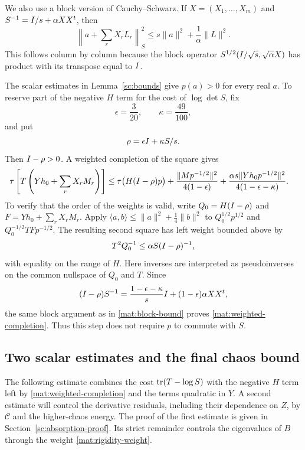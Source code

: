 We also use a block version of Cauchy--Schwarz.  If
$X=(X_1,\ldots,X_m)$ and $S^{-1}=I/s+\alpha XX^t$, then
\begin{equation}\label{mat:block-bound}
 \left\|a+\sum_rX_rL_r\right\|_S^2
 \le s\|a\|^2+\frac1\alpha\|L\|^2.
\end{equation}
This follows column by column because the block operator
$S^{1/2}(I/\sqrt{s},\sqrt{\alpha}X)$ has product with its transpose
equal to $I$.

The scalar estimates in Lemma~\ref{sc:bounds} give $p(a)>0$ for every
real $a$.  To reserve part of the negative $H$ term for the cost of
$\log\det S$, fix
\begin{equation}\label{mat:completion-constants}
 \epsilon=\frac3{20},\qquad\kappa=\frac{49}{100},
\end{equation}
and put
\[
 \rho=\epsilon I+\kappa S/s.
\]
Then $I-\rho>0$.  A weighted completion of the square gives
\begin{align}
 \tau\left[T\left(Yh_0+\sum_rX_rM_r\right)\right]
 &\le\tau\bigl(H(I-\rho)p\bigr)
       +\frac{\|M p^{-1/2}\|^2}{4(1-\epsilon)}
       +\frac{\alpha s\|Yh_0p^{-1/2}\|^2}
                    {4(1-\epsilon-\kappa)}.
 \label{mat:weighted-completion}
\end{align}
To verify that the order of the weights is valid, write
$Q_0=H(I-\rho)$ and $F=Yh_0+\sum_rX_rM_r$.
Apply $\langle a,b\rangle\le\|a\|^2+\frac14\|b\|^2$ to
$Q_0^{1/2}p^{1/2}$ and $Q_0^{-1/2}TFp^{-1/2}$.
The resulting second square has left weight bounded above by
\[
 T^2Q_0^{-1}\le\alpha S(I-\rho)^{-1},
\]
with equality on the range of $H$.  Here inverses are interpreted as
pseudoinverses on the common nullspace of $Q_0$ and $T$.
Since
\[
 (I-\rho)S^{-1}
   =\frac{1-\epsilon-\kappa}{s}I
           +(1-\epsilon)\alpha XX^t,
\]
the same block argument as in \eqref{mat:block-bound} proves
\eqref{mat:weighted-completion}.  Thus this step does not require $p$
to commute with $S$.

\subsection{Two scalar estimates and the final chaos bound}

The following estimate combines the cost $\operatorname{tr}(T-\log S)$ with the
negative $H$ term left by \eqref{mat:weighted-completion} and the
terms quadratic in $Y$.  A second estimate will control the derivative
residuals, including their dependence on $Z$, by $\mathcal C$ and the
higher-chaos energy.  The proof of the first estimate is given in
Section~\ref{sc:absorption-proof}.  Its strict remainder controls the
eigenvalues of $B$ through the weight \eqref{mat:rigidity-weight}.

